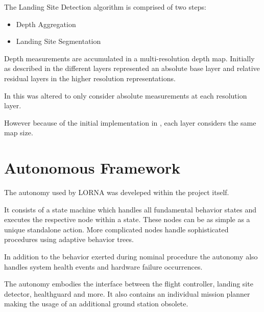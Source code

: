 The Landing Site Detection algorithm is comprised of two steps: 

\begin{itemize}
    \item Depth Aggregation
    \item Landing Site Segmentation
\end{itemize}

Depth measurements are accumulated in a multi-resolution depth map. Initially as described in \citet{LSD1} the different layers represented an absolute base layer and relative residual layers in the higher resolution representations.

In \citet{LSD2} this was altered to only consider absolute measurements at each resolution layer. 

However because of the initial implementation in \citep{LSD1}, each layer considers the same map size. 



\section{Autonomous Framework}

The autonomy \citep{Autonomy} used by LORNA was develeped within the project itself. 

It consists of a state machine which handles all fundamental behavior states and executes the respective node within a state. These nodes can be as simple as a unique standalone action. More complicated nodes handle sophisticated procedures using adaptive behavior trees. 

In addition to the behavior exerted during nominal procedure the autonomy also handles system health events and hardware failure occurrences.

The autonomy embodies the interface between the flight controller, landing site detector, healthguard and more. It also contains an individual mission planner making the usage of an additional ground station obsolete.